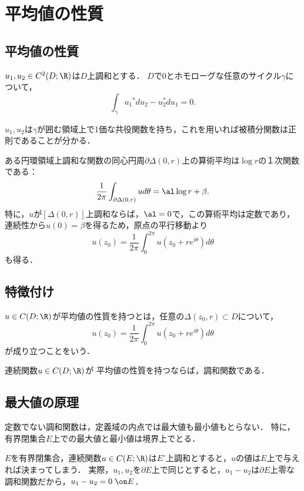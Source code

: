 \documentclass[uplatex, dvipdfmx]{jsreport}
\begin{document}
\section{平均値の性質}

\subsection{平均値の性質}

\begin{lemma}
    $u_1,u_2\in C^2(D;\R)$は$D$上調和とする．
    $D$で$0$とホモローグな任意のサイクル$\gamma$について，
    \[\int_\gamma u_1{}^*du_2-u_2^*du_1=0.\]
\end{lemma}
\begin{Proof}
    $u_1,u_2$は$\gamma$が囲む領域上で1価な共役関数を持ち，これを用いれば被積分関数は正則であることが分かる．
\end{Proof}

\begin{theorem}
    ある円環領域上調和な関数の同心円周$\partial\Delta(0,r)$上の算術平均は$\log r$の１次関数である：
    \[\frac{1}{2\pi}\int_{\partial\Delta(0,r)}ud\theta=\al\log r+\beta.\]
    特に，$u$が$[\Delta(0,r)]$上調和ならば，$\al=0$で，この算術平均は定数であり，連続性から$u(0)=\beta$を得るため，原点の平行移動より
    \[u(z_0)=\frac{1}{2\pi}\int^{2\pi}_0u(z_0+re^{i\theta})d\theta\]
    も得る．
\end{theorem}

\subsection{特徴付け}

\begin{definition}
    $u\in C(D;\R)$が平均値の性質を持つとは，任意の$\Delta(z_0,r)\subset D$について，
    \[u(z_0)=\frac{1}{2\pi}\int^{2\pi}_0u(z_0+re^{i\theta})d\theta\]
    が成り立つことをいう．
\end{definition}

\begin{theorem}
    連続関数$u\in C(D;\R)$が
    平均値の性質を持つならば，調和関数である．
\end{theorem}

\subsection{最大値の原理}

\begin{corollary}[最大値の原理]
    定数でない調和関数は，定義域の内点では最大値も最小値もとらない．
    特に，有界閉集合$E$上での最大値と最小値は境界上でとる．
\end{corollary}
\begin{remarks}[調和関数は境界の値で決まる]
    $E$を有界閉集合，連続関数$u\in C(E;\R)$は$E^\circ$上調和とすると，$u$の値は$E$上で与えれば決まってしまう．
    実際，$u_1,u_2$を$\partial E$上で同じとすると，$u_1-u_2$は$\partial E$上零な調和関数だから，$u_1-u_2=0\;\on E$．
\end{remarks}
\end{document}
